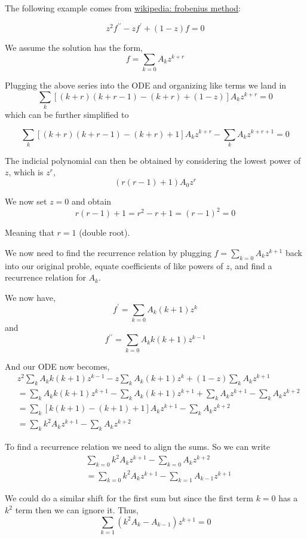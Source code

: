 The following example comes from
\href{https://en.wikipedia.org/wiki/Frobenius_method}{wikipedia: frobenius method}:

$$
z^2 f^{\prime\prime} - zf^\prime + (1-z)f = 0
$$

We assume the solution has the form,
$$
f = \sum_{k=0} A_k z^{k+r}
$$

Plugging the above series into the ODE and organizing like terms we land in
$$
\sum_k \left[ (k+r)(k+r-1) - (k+r) + (1-z) \right] A_k z^{k+r} = 0
$$
which can be further simplified to

$$
\sum_k \left[ (k+r)(k+r-1) - (k+r) + 1 \right] A_k z^{k+r}
    - \sum_k A_k z^{k+r+1} 
= 0
$$

The indicial polynomial can then be obtained by considering the lowest power of $z$, which is $z^r$,
$$
(r(r-1) + 1) A_0 z^r
$$

We now set $z=0$ and obtain
$$
r(r-1) + 1 = r^2 -r + 1 = (r-1)^2 = 0
$$

Meaning that $r=1$ (double root).

We now need to find the recurrence relation by plugging $f = \sum_{k=0} A_k z^{k+1}$ back into our original proble,
equate coefficients of like powers of $z$, and find a recurrence relation for $A_k$.

We now have,
$$
f^\prime = \sum_{k=0} A_k (k+1) z^k
$$
and
$$
f^{\prime\prime} = \sum_{k=0} A_k k(k+1) z^{k-1}
$$

And our ODE now becomes,
\begin{align*}
& z^2 \sum_{k} A_k k(k+1) z^{k-1}
    - z \sum_{k} A_k (k+1) z^k
    + (1-z) \sum_{k} A_k z^{k+1} \\
&= \sum_{k} A_k k(k+1) z^{k+1}
    - \sum_{k} A_k (k+1) z^{k+1}
    + \sum_{k} A_k z^{k+1}
    - \sum_{k} A_k z^{k+2} \\
&= \sum_k \left[ k(k+1) - (k+1) + 1 \right] A_k z^{k+1} - \sum_{k} A_k z^{k+2} \\
&= \sum_k k^2 A_k z^{k+1} - \sum_{k} A_k z^{k+2}
\end{align*}

To find a recurrence relation we need to align the sums.
So we can write
\begin{align*}
& \sum_{k=0} k^2 A_k z^{k+1} - \sum_{k=0} A_k z^{k+2} \\
&= \sum_{k=0} k^2 A_k z^{k+1} - \sum_{k=1} A_{k-1} z^{k+1}
\end{align*}

We could do a similar shift for the first sum but since the first term $k=0$ has a $k^2$ term then we can ignore it.
Thus,
$$
\sum_{k=1} \left( k^2 A_k - A_{k-1} \right) z^{k+1} = 0
$$

